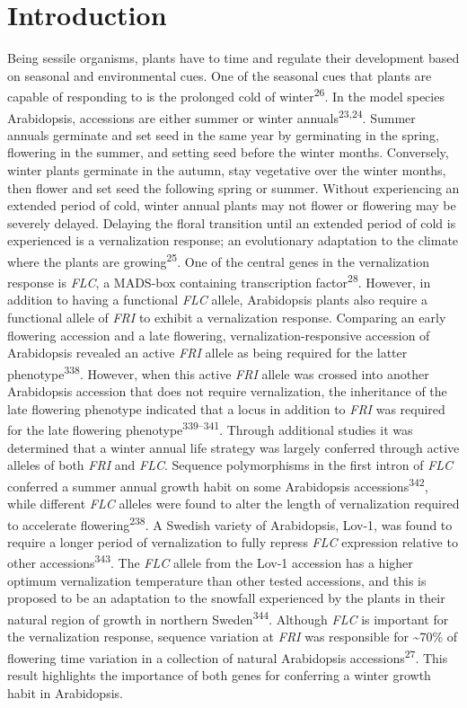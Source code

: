 \documentclass[12pt,]{book}
\begin{document}
\section{Introduction}\label{introduction}

Being sessile organisms, plants have to time and regulate their
development based on seasonal and environmental cues. One of the
seasonal cues that plants are capable of responding to is the prolonged
cold of winter\textsuperscript{26}. In the model species Arabidopsis,
accessions are either summer or winter annuals\textsuperscript{23,24}.
Summer annuals germinate and set seed in the same year by germinating in
the spring, flowering in the summer, and setting seed before the winter
months. Conversely, winter plants germinate in the autumn, stay
vegetative over the winter months, then flower and set seed the
following spring or summer. Without experiencing an extended period of
cold, winter annual plants may not flower or flowering may be severely
delayed. Delaying the floral transition until an extended period of cold
is experienced is a vernalization response; an evolutionary adaptation
to the climate where the plants are growing\textsuperscript{25}. One of
the central genes in the vernalization response is \emph{FLC}, a
MADS-box containing transcription factor\textsuperscript{28}. However,
in addition to having a functional \emph{FLC} allele, Arabidopsis plants
also require a functional allele of \emph{FRI} to exhibit a
vernalization response. Comparing an early flowering accession and a
late flowering, vernalization-responsive accession of Arabidopsis
revealed an active \emph{FRI} allele as being required for the latter
phenotype\textsuperscript{338}. However, when this active \emph{FRI}
allele was crossed into another Arabidopsis accession that does not
require vernalization, the inheritance of the late flowering phenotype
indicated that a locus in addition to \emph{FRI} was required for the
late flowering phenotype\textsuperscript{339--341}. Through additional
studies it was determined that a winter annual life strategy was largely
conferred through active alleles of both \emph{FRI} and \emph{FLC}.
Sequence polymorphisms in the first intron of \emph{FLC} conferred a
summer annual growth habit on some Arabidopsis
accessions\textsuperscript{342}, while different \emph{FLC} alleles were
found to alter the length of vernalization required to accelerate
flowering\textsuperscript{238}. A Swedish variety of Arabidopsis, Lov-1,
was found to require a longer period of vernalization to fully repress
\emph{FLC} expression relative to other accessions\textsuperscript{343}.
The \emph{FLC} allele from the Lov-1 accession has a higher optimum
vernalization temperature than other tested accessions, and this is
proposed to be an adaptation to the snowfall experienced by the plants
in their natural region of growth in northern
Sweden\textsuperscript{344}. Although \emph{FLC} is important for the
vernalization response, sequence variation at \emph{FRI} was responsible
for \textasciitilde{}70\% of flowering time variation in a collection of
natural Arabidopsis accessions\textsuperscript{27}. This result
highlights the importance of both genes for conferring a winter growth
habit in Arabidopsis.
\end{document}
